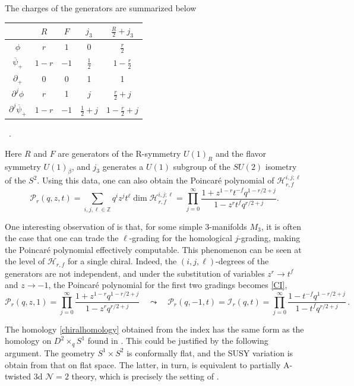 \documentclass[hyper,letterpaper]{JHEP3}
\newcommand{\be}{\begin{equation}}
\newcommand{\ee}{\end{equation}}
\newcommand{\Z}{{\mathbb Z}}
\renewcommand{\bar}{\overline}
\def\CH{{\mathcal H}}
\def\CI{{\mathcal I}}
\def\CN{{\mathcal N}}
\def\CP{{\mathcal P}}
\begin{document}
The charges of the generators are summarized below
\begin{center}
  \begin{tabular}{ c | c |c | c | c}
	 & $R$ & $F$ & $j_3$ & $\frac{R}{2}+j_3$\\
    \hline
    $\phi$ & $r$ & $1$ & 0 & $\frac{r}{2}$ \\ \hline
    $\bar{\psi}_+$ & $1-r$ & $-1$ & $\frac{1}{2}$ & $1-\frac{r}{2}$ \\ \hline
    $\partial_+$ &0 & 0 & 1 & 1 \\
    \hline \hline
		$\partial^j \phi$ & $r$ & 1 & $j$ &$\frac{r}{2} +j$
		\\ \hline
		$\partial^j \bar \psi_+$ & $1-r$ & $-1$ & $\frac{1}{2}+j$ & $1-\frac{r}{2} +j $ \\
  \end{tabular}\ .
\end{center}
Here $R$ and $F$ are generators of the R-symmetry $U(1)_R$ and the flavor symmetry $U(1)_{\beta}$, and $j_3$ generates a $U(1)$ subgroup of the $SU(2)$ isometry of the $S^2$. Using this data, one can also obtain the Poincar\'e polynomial of $\CH^{i,j;\ell}_{r,f}$
\be
\CP_r (q,z,t)= \sum_{i,j,\ell\in\Z}q^i z^j t^\ell \dim \CH_{r,f}^{i,j;\ell}=\prod_{j=0}^{\infty} \frac{1 + z^{1-r}t^{-f}q^{1-r/2+j}}{1-z^r t^f q^{r/2+j}}.
\ee

One interesting observation of \cite{Gukov:2016gkn} is that, for some simple 3-manifolds $M_3$, it is often the case that one can trade the $\ell$-grading for the homological $j$-grading, making the Poincar\'e polynomial effectively computable. This phenomenon can be seen at the level of $\CH_{r,f}$ for a single chiral. Indeed, the $(i,j,\ell)$-degrees of the generators are not independent, and under the substitution of variables $z^r\rightarrow t^{f}$ and $z\rightarrow -1$, the Poincar\'e polynomial for the first two gradings becomes \eqref{CI},
$$
\CP_r (q,z,1)= \prod_{j=0}^{\infty} \frac{1 + z^{1-r}q^{1-r/2+j}}{1-z^r q^{r/2+j}} \quad \leadsto \quad
\CP_r (q,-1,t) =\CI_r(q,t)= \prod_{j=0}^{\infty} \frac{1 - t^{-f}q^{1-r/2+j}}{1-t^f q^{r/2+j}} \,.
$$

The homology \eqref{chiralhomology} obtained from the index has the same form as the homology on $D^2\times_q S^1$ found in \cite{Gukov:2016gkn}. This could be justified by the following argument. The geometry $S^1\times S^2$ is conformally flat, and the SUSY variation is obtain from that on flat space. The latter, in turn, is equivalent to partially A-twisted 3d $\CN=2$ theory, which is precisely the setting of \cite{Gukov:2016gkn}.
\end{document}
